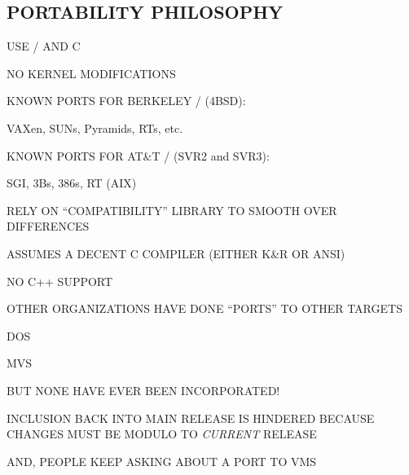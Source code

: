 \begin{bwslide}
\part*	{PORTABILITY PHILOSOPHY}\bf

\begin{nrtc}
\item	USE \unix/ AND C

\item	NO KERNEL MODIFICATIONS
\end{nrtc}
\end{bwslide}


\begin{bwslide}

\begin{nrtc}
\item	KNOWN PORTS FOR BERKELEY \unix/ (4BSD):
    \begin{nrtc}
    \item	VAXen, SUNs, Pyramids, RTs, etc.
    \end{nrtc}

\item	KNOWN PORTS FOR AT\&T \unix/ (SVR2 and SVR3):
    \begin{nrtc}
    \item	SGI, 3Bs, 386s, RT (AIX)
    \end{nrtc}

\item	RELY ON ``COMPATIBILITY'' LIBRARY TO SMOOTH OVER DIFFERENCES

\item	ASSUMES A DECENT C COMPILER (EITHER K\&R OR ANSI)
    \begin{nrtc}
    \item	NO C++ SUPPORT
    \end{nrtc}
\end{nrtc}
\end{bwslide}


\begin{bwslide}

\begin{nrtc}
\item	OTHER ORGANIZATIONS HAVE DONE ``PORTS'' TO OTHER TARGETS
    \begin{nrtc}
    \item	DOS

    \item	MVS
    \end{nrtc}
    BUT NONE HAVE EVER BEEN INCORPORATED!

\item	INCLUSION BACK INTO MAIN RELEASE IS HINDERED BECAUSE
	CHANGES MUST BE MODULO TO \emph{CURRENT} RELEASE

\item	AND, PEOPLE KEEP ASKING ABOUT A PORT TO VMS
\end{nrtc}
\end{bwslide}


